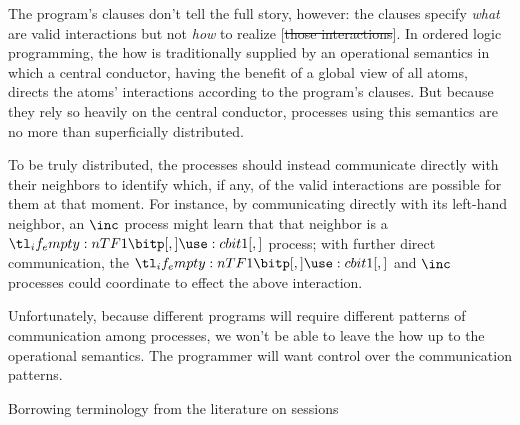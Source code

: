 The program's clauses don't tell the full story, however:
the clauses specify \emph{what} are valid interactions but not \emph{how} to realize [\st{those interactions}].
In ordered logic programming, the how is traditionally supplied by an operational semantics in which a central conductor, having the benefit of a global view of all atoms, directs the atoms' interactions according to the program's clauses.
But because they rely so heavily on the central conductor, processes using this semantics are no more than superficially distributed.


To be truly distributed, the processes should instead communicate directly with their neighbors to identify which, if any, of the valid interactions are possible for them at that moment.
For instance, by communicating directly with its left-hand neighbor, an $\inc$ process might learn that that neighbor is a $\bit{1}$ process; with further direct communication, the $\bit{1}$ and $\inc$ processes could coordinate to effect the above interaction.

Unfortunately, because different programs will require different patterns of communication among processes, we won't be able to leave the how up to the operational semantics.
The programmer will want control over the communication patterns.



Borrowing terminology from the literature on sessions


